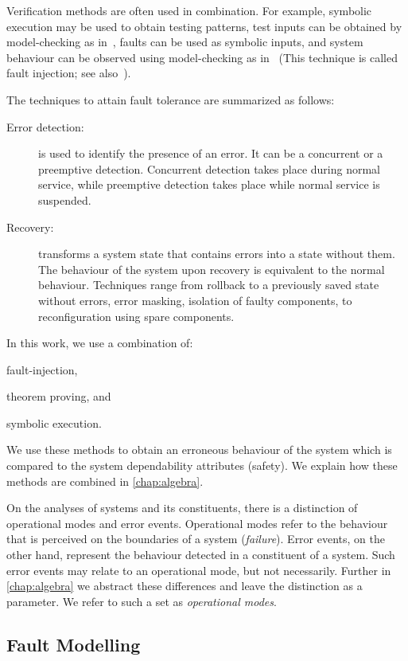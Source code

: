 Verification methods are often used in combination.
For example, symbolic execution may be used to obtain testing patterns, test inputs can be obtained by model-checking as in~\cite{CBC+2015}, faults can be used as symbolic inputs, and system behaviour can be observed using model-checking as in~\cite{DM2012,Didier2012} (This technique is called fault injection; see also~\cite{AAL+1996}).

The techniques to attain fault tolerance are summarized as follows:
\begin{description}
  \item[Error detection:] is used to identify the presence of an error.
  It can be a concurrent or a preemptive detection.
  Concurrent detection takes place during normal service, while preemptive detection takes place while normal service is suspended.
  \item[Recovery:] transforms a system state that contains errors into a state without them. The behaviour of the system upon recovery is equivalent to the normal behaviour.
  Techniques range from rollback to a previously saved state without errors, error masking, isolation of faulty components, to reconfiguration using spare components.
\end{description}

In this work, we use a combination of:
\begin{alineasinline}
  \item fault-injection,
  \item theorem proving, and
  \item symbolic execution.
\end{alineasinline}
We use these methods to obtain an erroneous behaviour of the system which is compared to the system dependability attributes (safety).
We explain how these methods are combined in \cref{chap:algebra}.

On the analyses of systems and its constituents, there is a distinction of operational modes and error events.
Operational modes refer to the behaviour that is perceived on the boundaries of a system (\emph{failure}).
Error events, on the other hand, represent the behaviour detected in a constituent of a system.
Such error events may relate to an operational mode, but not necessarily.
Further in \cref{chap:algebra} we abstract these differences and leave the distinction as a parameter.
We refer to such a set as \emph{operational modes}.

\subsection{Fault Modelling}

